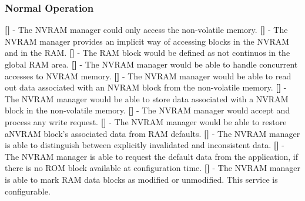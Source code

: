 \subsubsection{Normal Operation}
{\bf []} - The \mbox{NVRAM} manager could only access the non-volatile memory.\newline
\newline
{\bf []} - The \mbox{NVRAM} manager provides an implicit way of accessing blocks in the \mbox{NVRAM} and in the \mbox{RAM}.\newline
\newline
{\bf []} - The \mbox{RAM} block would be defined as not continuos in the global \mbox{RAM} area.\newline
\newline
{\bf []} - The \mbox{NVRAM} manager would be able to handle concurrent accesses to  \mbox{NVRAM} memory.\newline
\newline
{\bf []} - The \mbox{NVRAM} manager would be able to read out data associated with an  \mbox{NVRAM} block from the non-volatile memory.\newline
\newline
{\bf []} - The \mbox{NVRAM} manager would be able to store data associated with a \mbox{NVRAM} block in the non-volatile memory.\newline
\newline
{\bf []} - The \mbox{NVRAM} manager would accept and process any write request.\newline
\newline
{\bf []} - The \mbox{NVRAM} manager would be able to restore a\mbox{NVRAM} block's associated data from \mbox{RAM} defaults.\newline
\newline
{\bf []} - The \mbox{NVRAM} manager is able to distinguish between explicitly invalidated and inconsistent data.\newline
\newline
{\bf []} - The \mbox{NVRAM} manager is able to request the default data from the application, if there is no \mbox{ROM} block available at configuration time.\newline
\newline
{\bf []} - The \mbox{NVRAM} manager is able to mark \mbox{RAM} data blocks as modified or unmodified. This service is configurable.\newline
\newline
